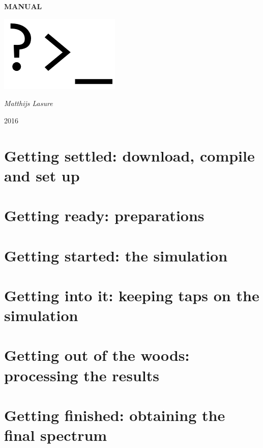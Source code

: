 \documentclass[a4paper,fleqn]{report}
\begin{document}
	
	\pagestyle{MyStyle}
	
	\begin{titlepage}
		\centering
		\null
		\vspace{5cm}

		{\huge\bfseries MANUAL\par}
		\vspace{1.5cm}
		\includegraphics[width=0.5\linewidth]{images/prompt.png}
		\vfill
		
		{\Large\itshape Matthijs Lasure\par}
		
		\vspace{1.5cm}
		
		{\large 2016\par}
		
	\end{titlepage}
	
	\tableofcontents
	
	\chapter{Getting settled: download, compile and set up}
	
	\chapter{Getting ready: preparations}
	
	\chapter{Getting started: the simulation}
	
	\chapter{Getting into it: keeping taps on the simulation}
	
	\chapter{Getting out of the woods: processing the results}
	
	\chapter{Getting finished: obtaining the final spectrum}
	
\end{document}
